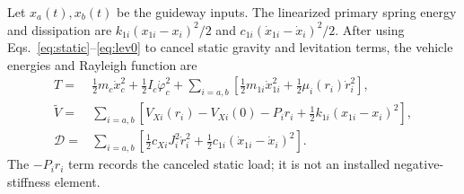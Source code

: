 \documentclass[a4paper,11pt]{article}
\numberwithin{equation}{section}
\begin{document}
Let $x_a(t),x_b(t)$ be the guideway inputs. The linearized primary spring energy and dissipation are $k_{1i}(x_{1i}-x_i)^2/2$ and $c_{1i}(\dot x_{1i}-\dot x_i)^2/2$. After using Eqs.~\eqref{eq:static}--\eqref{eq:lev0} to cancel static gravity and levitation terms, the vehicle energies and Rayleigh function are
\begin{align}
T={}&\tfrac12m_c\dot x_c^2+\tfrac12I_c\dot\varphi_c^2
{}+\sum_{i=a,b}\left[\tfrac12m_{1i}\dot x_{1i}^2
 +\tfrac12\mu_i(r_i)\dot r_i^2\right],\label{eq:T}\\
\widetilde V={}&\sum_{i=a,b}\left[V_{Xi}(r_i)-V_{Xi}(0)-P_i r_i
 +\tfrac12k_{1i}(x_{1i}-x_i)^2\right],\label{eq:V}\\
\mathcal D={}&\sum_{i=a,b}\left[\tfrac12c_{Xi}J_i^2\dot r_i^2
 +\tfrac12c_{1i}(\dot x_{1i}-\dot x_i)^2\right].\label{eq:D}
\end{align}
The $-P_i r_i$ term records the canceled static load; it is not an installed negative-stiffness element.
\end{document}
